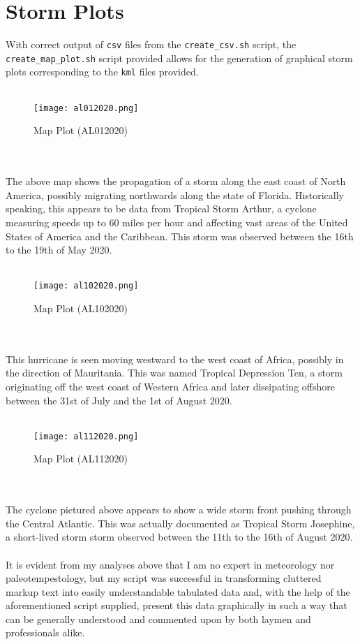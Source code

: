 \documentclass[]{article}
\begin{document}
    \section{Storm Plots}
    With correct output of \verb|csv| files from the \verb|create_csv.sh| script, the \verb|create_map_plot.sh| script provided allows for the generation of graphical storm plots corresponding to the \verb|kml| files provided.
    \\\\
    \begin{figure}[!ht]
        \centering
        \texttt{[image: al012020.png]}
        \caption{Map Plot (AL012020)}
        \label{fig:al012020}
    \end{figure}
    \\\\
    The above map shows the propagation of a storm along the east coast of North America, possibly migrating northwards along the state of Florida. Historically speaking, this appears to be data from Tropical Storm Arthur, a cyclone measuring speeds up to 60 miles per hour and affecting vast areas of the United States of America and the Caribbean. This storm was observed between the 16th to the 19th of May 2020.
    \\\\
    \begin{figure}[!ht]
        \centering
        \texttt{[image: al102020.png]}
        \caption{Map Plot (AL102020)}
        \label{fig:al102020}
    \end{figure}
    \\\\
    This hurricane is seen moving westward to the west coast of Africa, possibly in the direction of Mauritania. This was named Tropical Depression Ten, a storm originating off the west coast of Western Africa and later dissipating offshore between the 31st of July and the 1st of August 2020.
    \\\\
    \begin{figure}[!ht]
        \centering
        \texttt{[image: al112020.png]}
        \caption{Map Plot (AL112020)}
        \label{fig:al112020}
    \end{figure}
    \\\\
    The cyclone pictured above appears to show a wide storm front pushing through the Central Atlantic. This was actually documented as Tropical Storm Josephine, a short-lived storm storm observed between the 11th to the 16th of August 2020.
    \\\\
    It is evident from my analyses above that I am no expert in meteorology nor paleotempestology, but my script was successful in transforming cluttered markup text into easily understandable tabulated data and, with the help of the aforementioned script supplied, present this data graphically in such a way that can be generally understood and commented upon by both laymen and professionals alike.
    \newpage
\end{document}
